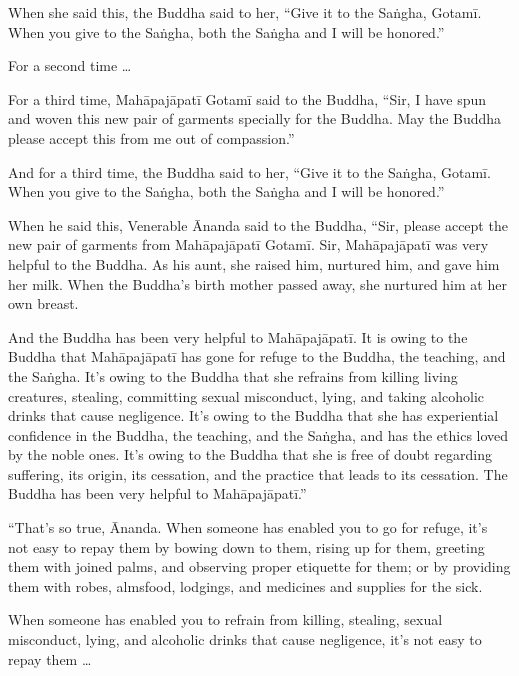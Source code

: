 \documentclass[12pt,openany]{book}%
\begin{document}
When she said this, the Buddha said to her, “Give it to the \textsanskrit{Saṅgha}, \textsanskrit{Gotamī}. When you give to the \textsanskrit{Saṅgha}, both the \textsanskrit{Saṅgha} and I will be honored.” 

For a second time … 

For a third time, \textsanskrit{Mahāpajāpatī} \textsanskrit{Gotamī} said to the Buddha, “Sir, I have spun and woven this new pair of garments specially for the Buddha. May the Buddha please accept this from me out of compassion.” 

And for a third time, the Buddha said to her, “Give it to the \textsanskrit{Saṅgha}, \textsanskrit{Gotamī}. When you give to the \textsanskrit{Saṅgha}, both the \textsanskrit{Saṅgha} and I will be honored.” 

When he said this, Venerable Ānanda said to the Buddha, “Sir, please accept the new pair of garments from \textsanskrit{Mahāpajāpatī} \textsanskrit{Gotamī}. Sir, \textsanskrit{Mahāpajāpatī} was very helpful to the Buddha. As his aunt, she raised him, nurtured him, and gave him her milk. When the Buddha’s birth mother passed away, she nurtured him at her own breast. 

And the Buddha has been very helpful to \textsanskrit{Mahāpajāpatī}. It is owing to the Buddha that \textsanskrit{Mahāpajāpatī} has gone for refuge to the Buddha, the teaching, and the \textsanskrit{Saṅgha}. It’s owing to the Buddha that she refrains from killing living creatures, stealing, committing sexual misconduct, lying, and taking alcoholic drinks that cause negligence. It’s owing to the Buddha that she has experiential confidence in the Buddha, the teaching, and the \textsanskrit{Saṅgha}, and has the ethics loved by the noble ones. It’s owing to the Buddha that she is free of doubt regarding suffering, its origin, its cessation, and the practice that leads to its cessation. The Buddha has been very helpful to \textsanskrit{Mahāpajāpatī}.” 

“That’s so true, Ānanda. When someone has enabled you to go for refuge, it’s not easy to repay them by bowing down to them, rising up for them, greeting them with joined palms, and observing proper etiquette for them; or by providing them with robes, almsfood, lodgings, and medicines and supplies for the sick. 

When someone has enabled you to refrain from killing, stealing, sexual misconduct, lying, and alcoholic drinks that cause negligence, it’s not easy to repay them … 
\end{document}
